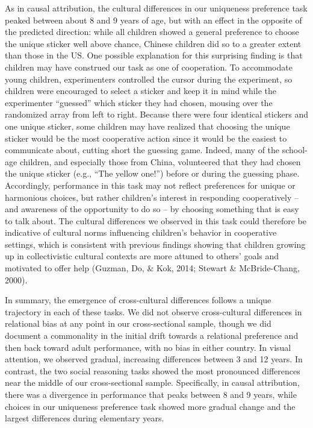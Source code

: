 \documentclass[10pt, letterpaper]{article}
\begin{document}
As in causal attribution, the cultural differences in our uniqueness
preference task peaked between about 8 and 9 years of age, but with an
effect in the opposite of the predicted direction: while all children
showed a general preference to choose the unique sticker well above
chance, Chinese children did so to a greater extent than those in the
US. One possible explanation for this surprising finding is that
children may have construed our task as one of cooperation. To
accommodate young children, experimenters controlled the cursor during
the experiment, so children were encouraged to select a sticker and keep
it in mind while the experimenter ``guessed'' which sticker they had
chosen, mousing over the randomized array from left to right. Because
there were four identical stickers and one unique sticker, some children
may have realized that choosing the unique sticker would be the most
cooperative action since it would be the easiest to communicate about,
cutting short the guessing game. Indeed, many of the school-age
children, and especially those from China, volunteered that they had
chosen the unique sticker (e.g., ``The yellow one!'') before or during
the guessing phase. Accordingly, performance in this task may not
reflect preferences for unique or harmonious choices, but rather
children's interest in responding cooperatively -- and awareness of the
opportunity to do so -- by choosing something that is easy to talk
about. The cultural differences we observed in this task could therefore
be indicative of cultural norms influencing children's behavior in
cooperative settings, which is consistent with previous findings showing
that children growing up in collectivistic cultural contexts are more
attuned to others' goals and motivated to offer help (Guzman, Do, \&
Kok, 2014; Stewart \& McBride-Chang, 2000).

In summary, the emergence of cross-cultural differences follows a unique
trajectory in each of these tasks. We did not observe cross-cultural
differences in relational bias at any point in our cross-sectional
sample, though we did document a commonality in the initial drift
towards a relational preference and then back toward adult performance,
with no bias in either country. In visual attention, we observed
gradual, increasing differences between 3 and 12 years. In contrast, the
two social reasoning tasks showed the most pronounced differences near
the middle of our cross-sectional sample. Specifically, in causal
attribution, there was a divergence in performance that peaks between 8
and 9 years, while choices in our uniqueness preference task showed more
gradual change and the largest differences during elementary years.
\end{document}
